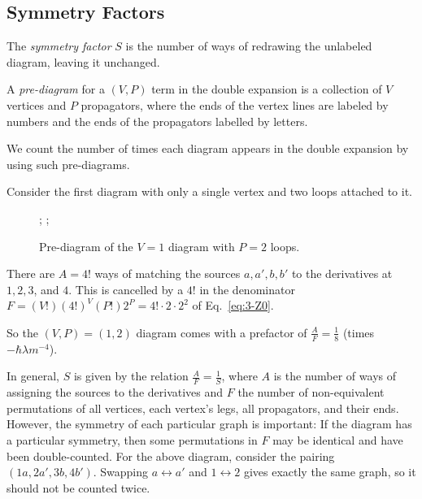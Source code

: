 \subsection{Symmetry Factors}%
\label{sub:symmetry_factors}

\begin{definition}
  The \emph{symmetry factor} $S$ is the number of ways of redrawing the unlabeled diagram, leaving it unchanged.
\end{definition}

\begin{definition}
  A \emph{pre-diagram} for a $(V, P)$ term in the double expansion is a collection of $V$ vertices and $P$ propagators, where the ends of the vertex lines are labeled by numbers and the ends of the propagators labelled by letters.
\end{definition}
We count the number of times each diagram appears in the double expansion by using such pre-diagrams.

\begin{example}[$V = 1$]
  Consider the first diagram with only a single vertex and two loops attached to it.
  \begin{figure}[tbhp]
    \centering
    ;
    \qquad
    ;
    \caption{Pre-diagram of the $V = 1$ diagram with $P = 2$ loops.}
    \label{fig:l3f2}
  \end{figure}
  There are $A = 4!$ ways of matching the sources $a, a', b, b'$ to the derivatives at $1, 2, 3$, and $4$.
  This is cancelled by a $4!$ in the denominator $F = (V!) (4!)^V (P!) 2^P = 4! \cdot 2 \cdot 2^2$ of Eq.~\eqref{eq:3-Z0}.

  So the $(V, P)= (1, 2)$ diagram comes with a prefactor of $\frac{A}{F} = \frac{1}{8}$ (times $-\hbar \lambda m^{-4}$). 
\end{example}

In general, $S$ is given by the relation $\frac{A}{F} = \frac{1}{S}$, where $A$ is the number of ways of assigning the sources to the derivatives and $F$ the number of non-equivalent permutations of all vertices, each vertex's legs, all propagators, and their ends.
However, the symmetry of each particular graph is important: If the diagram has a particular symmetry, then some permutations in $F$ may be identical and have been double-counted.
For the above diagram, consider the pairing $(1a, 2a', 3b, 4b')$. Swapping $a \leftrightarrow a'$ and $1 \leftrightarrow 2$ gives exactly the same graph, so it should not be counted twice.

